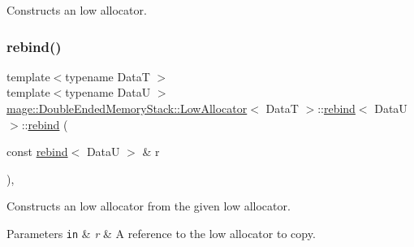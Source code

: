 Constructs an low allocator. \hypertarget{structmage_1_1_double_ended_memory_stack_1_1_low_allocator_1_1rebind_a83aa74b68f3d51f517aa872af16f3712}{}\label{structmage_1_1_double_ended_memory_stack_1_1_low_allocator_1_1rebind_a83aa74b68f3d51f517aa872af16f3712} 
\subsubsection{\texorpdfstring{rebind()}{rebind()}\hspace{0.1cm}{\footnotesize\ttfamily [2/3]}}
{\footnotesize\ttfamily template$<$typename DataT $>$ \\
template$<$typename DataU $>$ \\
\hyperlink{structmage_1_1_double_ended_memory_stack_1_1_low_allocator}{mage\+::\+Double\+Ended\+Memory\+Stack\+::\+Low\+Allocator}$<$ DataT $>$\+::\hyperlink{structmage_1_1_double_ended_memory_stack_1_1_low_allocator_1_1rebind}{rebind}$<$ DataU $>$\+::\hyperlink{structmage_1_1_double_ended_memory_stack_1_1_low_allocator_1_1rebind}{rebind} (\begin{DoxyParamCaption}\item[{const \hyperlink{structmage_1_1_double_ended_memory_stack_1_1_low_allocator_1_1rebind}{rebind}$<$ DataU $>$ \&}]{r }\end{DoxyParamCaption})\hspace{0.3cm}{\ttfamily [private]}, {\ttfamily [delete]}}

Constructs an low allocator from the given low allocator.


\begin{DoxyParams}[1]{Parameters}
\mbox{\tt in}  & {\em r} & A reference to the low allocator to copy. \\
\hline
\end{DoxyParams}
\hypertarget{structmage_1_1_double_ended_memory_stack_1_1_low_allocator_1_1rebind_a3d180ba2f831083dd8850b7f05c10b32}{}\label{structmage_1_1_double_ended_memory_stack_1_1_low_allocator_1_1rebind_a3d180ba2f831083dd8850b7f05c10b32} 
